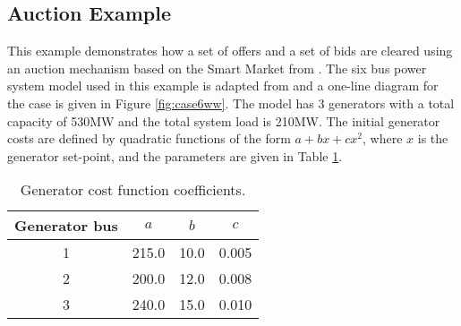 \subsection{Auction Example}
This example demonstrates how a set of offers and a set of bids are cleared
using an auction mechanism based on the Smart Market from
.  The six bus power system model used in this example
is adapted from  and a
one-line diagram for the case is given in Figure \ref{fig:case6ww}.  The model
has 3 generators with a total capacity of 530MW and the total system load is
210MW.  The initial generator costs are defined by quadratic functions of the
form $a + bx + cx^2$, where $x$ is the generator set-point, and the parameters
are given in Table \ref{tbl:ex_coeffs}.
\begin{table}
\begin{center}
\begin{tabular}{c|c|c|c}
\hline
Generator bus & $a$ & $b$ & $c$ \\
\hline
1 & 215.0 & 10.0 & 0.005 \\
2 & 200.0 & 12.0 & 0.008 \\
3 & 240.0 & 15.0 & 0.010 \\
\hline
\end{tabular}
\end{center}
\caption{Generator cost function coefficients.}
\label{tbl:ex_coeffs}
\end{table}

